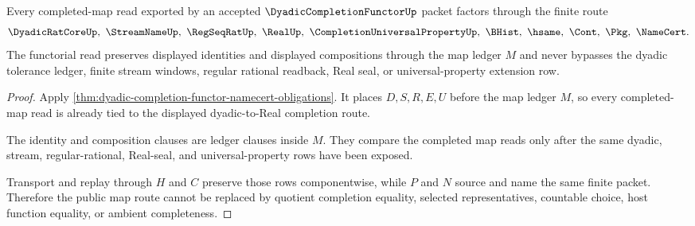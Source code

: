 \begin{theorem}
\label{thm:dyadic-completion-functor-map-route}
Every completed-map read exported by an accepted $\DyadicCompletionFunctorUp$ packet factors through the finite route
$$
\DyadicRatCoreUp,\ \StreamNameUp,\ \RegSeqRatUp,\ \RealUp,\ \CompletionUniversalPropertyUp,\ \BHist,\ \hsame,\ \Cont,\ \Pkg,\ \NameCert .
$$
The functorial read preserves displayed identities and displayed compositions through the map ledger $M$ and never bypasses the dyadic tolerance ledger, finite stream windows, regular rational readback, Real seal, or universal-property extension row.
\end{theorem}
\begin{proof}
Apply \autoref{thm:dyadic-completion-functor-namecert-obligations}. It places $D,S,R,E,U$ before the map ledger $M$, so every completed-map read is already tied to the displayed dyadic-to-Real completion route.

The identity and composition clauses are ledger clauses inside $M$. They compare the completed map reads only after the same dyadic, stream, regular-rational, Real-seal, and universal-property rows have been exposed.

Transport and replay through $H$ and $C$ preserve those rows componentwise, while $P$ and $N$ source and name the same finite packet. Therefore the public map route cannot be replaced by quotient completion equality, selected representatives, countable choice, host function equality, or ambient completeness.
\end{proof}




